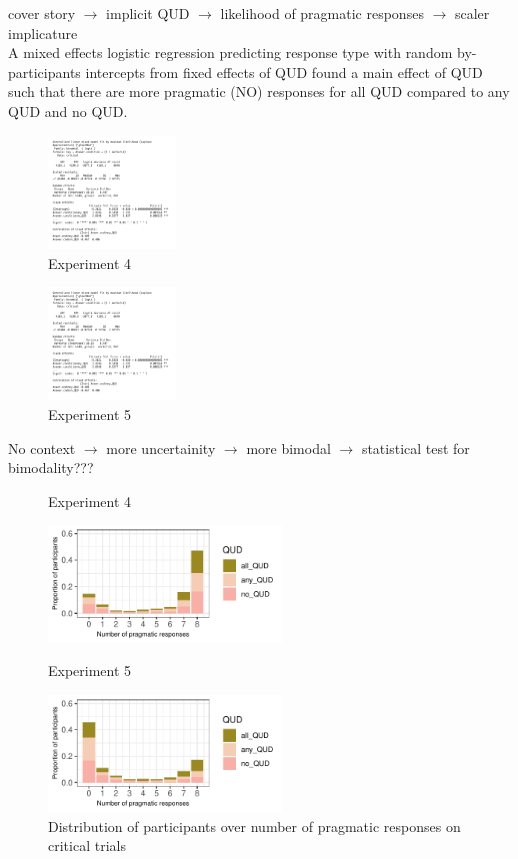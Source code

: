 \documentclass[12pt]{article}
\begin{document}
\noindent cover story $\rightarrow$ implicit QUD $\rightarrow$ likelihood of pragmatic responses $\rightarrow$ scaler implicature\\

\noindent A mixed effects logistic regression predicting response type with random by-participants intercepts from fixed effects of QUD found a main effect of QUD such that there are more pragmatic (NO) responses for all QUD compared to any QUD and no QUD. 

\begin{figure}[!ht] 
    \caption*{Experiment 4}
    \includegraphics[height=3cm]{models/exp4_model1}
\end{figure}
\begin{figure}[!ht]
    \caption*{Experiment 5}
    \includegraphics[height=3cm]{models/exp4_model1}
\end{figure} 

\pagebreak

\noindent No context $\rightarrow$ more uncertainity $\rightarrow$ more bimodal $\rightarrow$ statistical test for bimodality???

\begin{figure}[!ht] 
    \begin{minipage}{.5\textwidth}
    \caption*{Experiment 4}
    \includegraphics[height=3.1cm]{img/exp4_count_pragmatic.pdf}
    \end{minipage}%
    \begin{minipage}{.5\textwidth}
    \caption*{Experiment 5}
    \includegraphics[height=3.1cm]{img/exp5_count_pragmatic.pdf}
    \end{minipage}%
    \caption{Distribution of participants over number of pragmatic responses on critical trials}
\end{figure}
\end{document}
